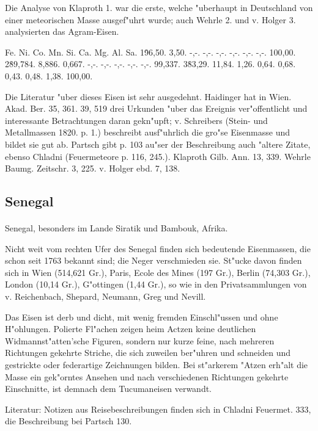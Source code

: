 \documentclass[a4paper, 11pt, oneside]{article}
\begin{document}
Die Analyse von Klaproth 1. war die erste, welche "uberhaupt in Deutschland von einer meteorischen Masse ausgef"uhrt wurde; auch Wehrle 2. und v. Holger 3. analysierten das Agram-Eisen.

Fe. Ni. Co. Mn. Si. Ca. Mg. Al. Sa.  
1\. 96,50. 3,50. -,-. -,-. -,-. -,-. -,-. -,-. 100,00.  
2\. 89,784. 8,886. 0,667. -,-. -,-. -,-. -,-. -,-. 99,337.  
3\. 83,29. 11,84. 1,26. 0,64. 0,68. 0,43. 0,48. 1,38. 100,00.

\footnotesize
Die Literatur "uber dieses Eisen ist sehr ausgedehnt. Haidinger hat in Wien. Akad. Ber. 35, 361. 39, 519 drei Urkunden "uber das Ereignis ver"offentlicht und interessante Betrachtungen daran gekn"upft; v. Schreibers (Stein- und Metallmassen 1820. p. 1.) beschreibt ausf"uhrlich die gro"se Eisenmasse und bildet sie gut ab. Partsch gibt p. 103 au"ser der Beschreibung auch "altere Zitate, ebenso Chladni (Feuermeteore p. 116, 245.). Klaproth Gilb. Ann. 13, 339. Wehrle Baumg. Zeitschr. 3, 225. v. Holger ebd. 7, 138.

\subsection{Senegal}
\normalsize
\paragraph{}
Senegal, besonders im Lande Siratik und Bambouk, Afrika.

Nicht weit vom rechten Ufer des Senegal finden sich bedeutende Eisenmassen, die schon seit 1763 bekannt sind; die Neger verschmieden sie. St"ucke davon finden sich in Wien (514,621 Gr.), Paris, Ecole des Mines (197 Gr.), Berlin (74,303 Gr.), London (10,14 Gr.), G"ottingen (1,44 Gr.), so wie in den Privatsammlungen von v. Reichenbach, Shepard, Neumann, Greg und Nevill.

Das Eisen ist derb und dicht, mit wenig fremden Einschl"ussen und ohne H"ohlungen. Polierte Fl"achen zeigen heim Actzen keine deutlichen Widmannst"atten'sche Figuren, sondern nur kurze feine, nach mehreren Richtungen gekehrte Striche, die sich zuweilen ber"uhren und schneiden und gestrickte oder federartige Zeichnungen bilden. Bei st"arkerem "Atzen erh"alt die Masse ein gek"orntes Ansehen und nach verschiedenen Richtungen gekehrte Einschnitte, ist demnach dem Tucumaneisen verwandt.

Literatur: Notizen aus Reisebeschreibungen finden sich in Chladni Feuermet. 333, die Beschreibung bei Partsch 130.
\end{document}
